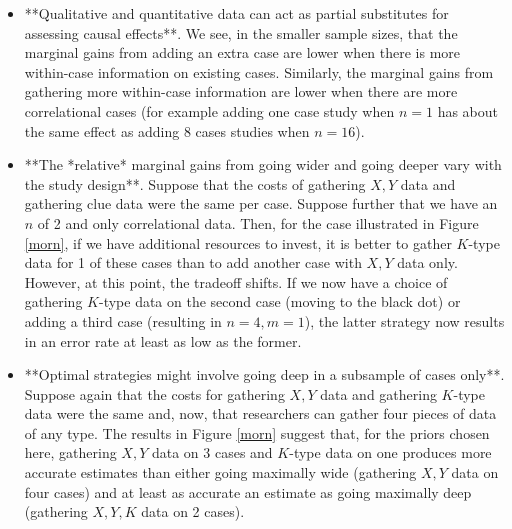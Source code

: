 \documentclass[12pt,]{book}
\begin{document}
\begin{itemize}
\item **Qualitative and quantitative data can act as partial substitutes for assessing causal effects**. We see, in the smaller sample sizes, that the marginal gains from adding an extra case are lower when there is more within-case information on existing cases. Similarly, the marginal gains from gathering more within-case information are lower when there are more correlational cases (for example adding one case study when $n=1$ has about the same effect as adding 8 cases studies when $n=16$). 
\item **The *relative* marginal gains from going wider and going deeper vary with the study design**. Suppose that the costs of gathering $X,Y$ data and gathering clue data were the same per case. Suppose further that we have an $n$ of 2 and only correlational data. Then, for the case illustrated in Figure \ref{morn}, if we have additional resources to invest, it is better to gather $K$-type data for 1 of these cases than to add another case with $X,Y$ data only. However, at this point, the tradeoff shifts. If we now have a choice of gathering $K$-type data on the second case (moving to the black dot) or adding a third case (resulting in $n=4,m=1$), the latter strategy now results in an error rate at least as low as the former. %
\item **Optimal strategies might involve going deep in a subsample of cases only**. Suppose again that the costs for gathering $X,Y$ data and gathering $K$-type data were the same and, now, that researchers can gather four pieces of data of any type. The results in Figure \ref{morn} suggest that, for the priors chosen here, gathering $X,Y$ data on 3 cases and $K$-type data on one produces more accurate estimates than either going maximally wide (gathering $X,Y$ data on four cases) and at least as accurate an estimate as going maximally deep (gathering $X,Y,K$ data on 2 cases).

\end{itemize}
\end{document}
